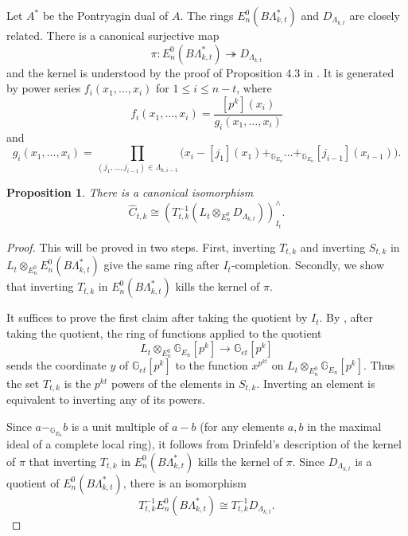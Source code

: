 \documentclass[oneside]{amsart}
\newtheorem{prop}[thm]{Proposition}
\theoremstyle{definition}
\theoremstyle{remark}
\theoremstyle{theorem}
\numberwithin{equation}{section}
\DeclareMathOperator{\colim}{colim}
\newcommand{\Prod}[1]{\underset{#1}{\prod}}
\newcommand{\E}{E_{n}}
\newcommand{\lkt}{\Lambda_{k,t}}
\newcommand{\bG}{\mathbb{G}}
\begin{document}
Let $A^*$ be the Pontryagin dual of $A$. The rings $\E^0(B\lkt^*)$ and $D_{\lkt}$ are closely related. There is a canonical surjective map
\[
\pi \colon \E^0(B\lkt^*) \twoheadrightarrow D_{\lkt}
\]
and the kernel is understood by the proof of Proposition 4.3 in \cite{drinfeld_ell1}. It is generated by power series $f_i(x_1, \ldots, x_i)$ for $1 \leq i \leq n-t$, where
\[
f_i(x_1, \ldots, x_i) = \frac{[p^k](x_i)}{g_i(x_1, \ldots, x_i)}
\]
and 
\[
g_i(x_1, \ldots, x_i) = \Prod{(j_1, \ldots, j_{i-1}) \in \Lambda_{k,i-1}} \big ( x_i - [j_1](x_1) +_{\bG_{E_n}} \ldots +_{\bG_{E_n}} [j_{i-1}](x_{i-1}) \big ).
\]

\begin{comment}
In ??, the first author introduced a ring 
\[
C_{t} = \colim_{k} C_{t,k}
\]
to act as the coefficients for the target of the transchromatic character maps. 
\end{comment}

\begin{prop}\label{prop:ctkformula}
There is a canonical isomorphism
\[
\hat{C}_{t,k} \cong (T_{t,k}^{-1} (L_t \otimes_{\E^0} D_{\lkt}))^{\wedge}_{I_t}.
\]
\end{prop}
\begin{proof}
This will be proved in two steps. First, inverting $T_{t,k}$ and inverting $S_{t,k}$ in $L_{t} \otimes_{\E^0} \E^0(B\lkt^*)$ give the same ring after $I_t$-completion. Secondly, we show that inverting $T_{t,k}$ in $\E^0(B\lkt^*)$ kills the kernel of $\pi$.

It suffices to prove the first claim after taking the quotient by $I_t$. By \cite[proof of Proposition 2.5]{stapleton_tgcm}, after taking the quotient, the ring of functions applied to the quotient
\[
L_t \otimes_{\E^0} \bG_{E_n}[p^k] \rightarrow \bG_{et}[p^k]
\]
sends the coordinate $y$ of $\bG_{et}[p^k]$ to the function $x^{p^{kt}}$ on $L_t \otimes_{\E^0}\bG_{E_n}[p^k]$. Thus the set $T_{t,k}$ is the $p^{kt}$ powers of the elements in $S_{t,k}$. Inverting an element is equivalent to inverting any of its powers.

Since $a -_{\bG_{E_n}} b$ is a unit multiple of $a-b$ (for any elements $a,b$ in the maximal ideal of a complete local ring), it follows from Drinfeld's description of the kernel of $\pi$ that inverting $T_{t,k}$ in $\E^0(B\lkt^*)$ kills the kernel of $\pi$. Since $D_{\lkt}$ is a quotient of $\E^0(B\lkt^*)$, there is an isomorphism
\[
T_{t,k}^{-1}\E^0(B\lkt^*) \cong T_{t,k}^{-1}D_{\lkt}.
\]
\end{proof}
\end{document}

